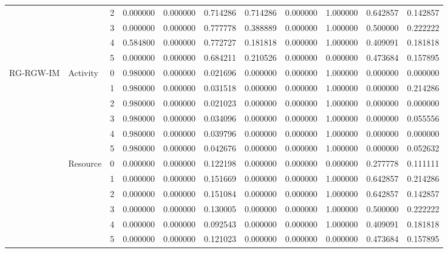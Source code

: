 \begin{tabular}{lllrrrrrrrr}
 &  & 2 & 0.000000 & 0.000000 & 0.714286 & 0.714286 & 0.000000 & 1.000000 & 0.642857 & 0.142857 \\
 &  & 3 & 0.000000 & 0.000000 & 0.777778 & 0.388889 & 0.000000 & 1.000000 & 0.500000 & 0.222222 \\
 &  & 4 & 0.584800 & 0.000000 & 0.772727 & 0.181818 & 0.000000 & 1.000000 & 0.409091 & 0.181818 \\
 &  & 5 & 0.000000 & 0.000000 & 0.684211 & 0.210526 & 0.000000 & 0.000000 & 0.473684 & 0.157895 \\
\cline{1-11} \cline{2-11}
\multirow[t]{12}{*}{RG-RGW-IM} & \multirow[t]{6}{*}{Activity} & 0 & 0.980000 & 0.000000 & 0.021696 & 0.000000 & 0.000000 & 1.000000 & 0.000000 & 0.000000 \\
 &  & 1 & 0.980000 & 0.000000 & 0.031518 & 0.000000 & 0.000000 & 1.000000 & 0.000000 & 0.214286 \\
 &  & 2 & 0.980000 & 0.000000 & 0.021023 & 0.000000 & 0.000000 & 1.000000 & 0.000000 & 0.000000 \\
 &  & 3 & 0.980000 & 0.000000 & 0.034096 & 0.000000 & 0.000000 & 1.000000 & 0.000000 & 0.055556 \\
 &  & 4 & 0.980000 & 0.000000 & 0.039796 & 0.000000 & 0.000000 & 1.000000 & 0.000000 & 0.000000 \\
 &  & 5 & 0.980000 & 0.000000 & 0.042676 & 0.000000 & 0.000000 & 1.000000 & 0.000000 & 0.052632 \\
\cline{2-11}
 & \multirow[t]{6}{*}{Resource} & 0 & 0.000000 & 0.000000 & 0.122198 & 0.000000 & 0.000000 & 0.000000 & 0.277778 & 0.111111 \\
 &  & 1 & 0.000000 & 0.000000 & 0.151669 & 0.000000 & 0.000000 & 1.000000 & 0.642857 & 0.214286 \\
 &  & 2 & 0.000000 & 0.000000 & 0.151084 & 0.000000 & 0.000000 & 1.000000 & 0.642857 & 0.142857 \\
 &  & 3 & 0.000000 & 0.000000 & 0.130005 & 0.000000 & 0.000000 & 1.000000 & 0.500000 & 0.222222 \\
 &  & 4 & 0.000000 & 0.000000 & 0.092543 & 0.000000 & 0.000000 & 1.000000 & 0.409091 & 0.181818 \\
 &  & 5 & 0.000000 & 0.000000 & 0.121023 & 0.000000 & 0.000000 & 0.000000 & 0.473684 & 0.157895 \\
\cline{1-11} \cline{2-11}
\bottomrule
\end{tabular}
